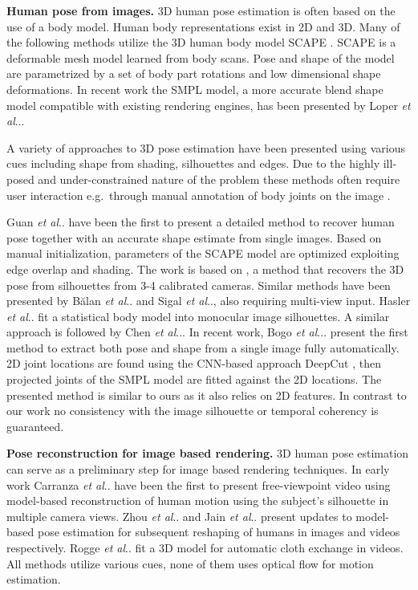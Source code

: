 \documentclass[10pt,twocolumn,letterpaper]{article}
\makeatletter
\DeclareRobustCommand\onedot{\futurelet\@let@token\@onedot}
\def\@onedot{\ifx\@let@token.\else.\null\fi\xspace}
\def\etal{\emph{et al}\onedot}
\makeatother
\begin{document}
\textbf{Human pose from images.}
3D human pose estimation is often based on the use of a body model. Human body representations exist in 2D and 3D. Many of the following methods utilize the 3D human body model SCAPE \cite{anguelov2005scape}. SCAPE is a deformable mesh model learned from body scans. Pose and shape of the model are parametrized by a set of body part rotations and low dimensional shape deformations. %
In recent work the SMPL model, a more accurate blend shape model compatible with existing rendering engines, has been presented by Loper \etal \cite{smpl2015loper}.

A variety of approaches to 3D pose estimation have been presented using various cues including shape from shading, silhouettes and edges. Due to the highly ill-posed and under-constrained nature of the problem these methods often require user interaction e.g.\ through manual annotation of body joints on the image \cite{taylor2000reconstruction,parameswaran2004view}.

Guan \etal \cite{guan2009estimating} have been the first to present a detailed method to recover human pose together with an accurate shape estimate from single images. Based on manual initialization, parameters of the SCAPE model are optimized exploiting edge overlap and shading. The work is based on \cite{bualan2007detailed}, a method that recovers the 3D pose from silhouettes from 3-4 calibrated cameras. Similar methods have been presented by B{\u{a}}lan \etal \cite{bualan2007shining} and Sigal \etal \cite{sigal2007combined}, also requiring multi-view input.
Hasler \etal \cite{hasler2010multilinear} fit a statistical body model \cite{hasler2009statistical} into monocular image silhouettes. A similar approach is followed by Chen \etal \cite{chen2010inferring}. In recent work, Bogo \etal.  \cite{bogo2016smplify} present the first method to extract both pose and shape from a single image fully automatically. 2D joint locations are found using the CNN-based approach DeepCut \cite{deepcut16cvpr}, then projected joints of the SMPL model are fitted against the 2D locations. The presented method is similar to ours as it also relies on 2D features. In contrast to our work no consistency with the image silhouette or temporal coherency is guaranteed.

\textbf{Pose reconstruction for image based rendering.} 
3D human pose estimation can serve as a preliminary step for image based rendering techniques. In early work Carranza  \etal \cite{carranza2003free} have been the first to present free-viewpoint video using model-based reconstruction of human motion using the subject's silhouette in multiple camera views. Zhou \etal \cite{zhou2010parametric} and Jain \etal \cite{jain2010moviereshape} present updates to model-based pose estimation for subsequent reshaping of humans in images and videos respectively. Rogge \etal \cite{rogge2014garment} fit a 3D model for automatic cloth exchange in videos. All methods utilize various cues, none of them uses optical flow for motion estimation.
\end{document}
